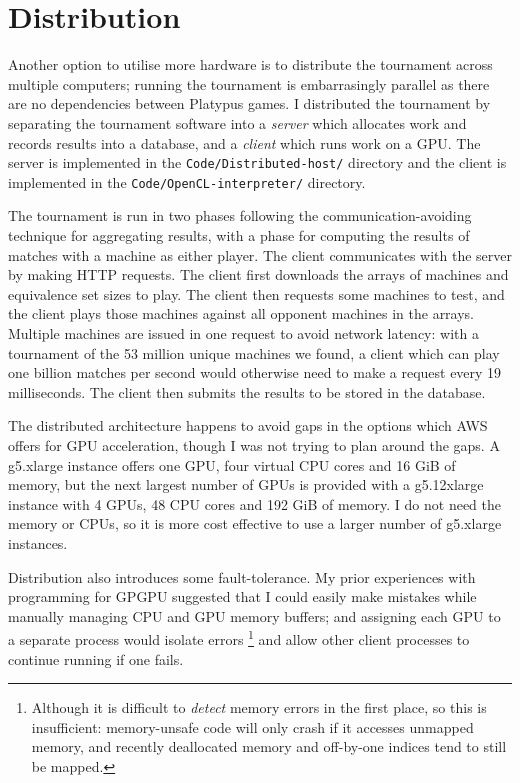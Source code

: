 \section{Distribution}
\label{sec:distribution}

Another option to utilise more hardware is to distribute the tournament
across multiple computers; running the tournament is embarrasingly
parallel as there are no dependencies between Platypus games. I distributed
the tournament by separating the tournament software into a \emph{server}
which allocates work and records results into a database, and a \emph{client}
which runs work on a GPU. The server is implemented in the
\texttt{Code/Distributed-host/} directory and the client is implemented
in the \texttt{Code/OpenCL-interpreter/} directory.

The tournament is run in two phases following the communication-avoiding
technique for aggregating results, with a phase for computing the results
of matches with a machine as either player.
The client communicates with the server by making HTTP requests. The client
first downloads the arrays of machines and equivalence set sizes to play.
The client then requests some machines to test, and the client plays those
machines against all opponent machines in the arrays. Multiple machines
are issued in one request to avoid network latency: with a tournament of the
53 million unique machines we found, a client which can play one billion
matches per second would otherwise need to make a request every 19
milliseconds. The client then submits the results to be stored in the database.

The distributed architecture happens to avoid gaps in the options which AWS
offers for GPU acceleration, though I was not trying to plan around the gaps.
A g5.xlarge instance offers one GPU, four virtual CPU cores and 16 GiB of
memory, but the next largest number of GPUs is provided with a g5.12xlarge
instance with 4 GPUs, 48 CPU cores and 192 GiB of memory. I do not need the
memory or CPUs, so it is more cost effective to use a larger number of
g5.xlarge instances.

Distribution also introduces some fault-tolerance. My prior experiences with
programming for GPGPU suggested that I could easily make mistakes while
manually managing CPU and GPU memory buffers; and assigning each GPU
to a separate process would isolate errors%
\footnote{Although it is difficult to \emph{detect} memory errors in the
  first place, so this is insufficient: memory-unsafe code will only crash
  if it accesses unmapped memory, and recently deallocated
  memory and off-by-one indices tend to still be mapped.}
and allow other client processes to continue running if one fails.


